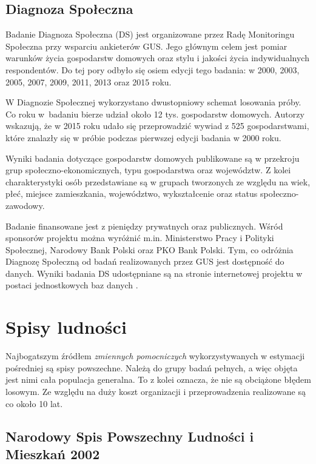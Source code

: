 \subsection{Diagnoza Społeczna}

Badanie Diagnoza Społeczna (DS) jest organizowane przez Radę Monitoringu Społeczna przy wsparciu ankieterów GUS. Jego głównym celem jest pomiar warunków życia gospodarstw domowych oraz stylu i jakości życia indywidualnych respondentów. Do tej pory odbyło się osiem edycji tego badania: w 2000, 2003, 2005, 2007, 2009, 2011, 2013 oraz 2015 roku. 

W Diagnozie Społecznej wykorzystano dwustopniowy schemat losowania próby. Co roku w~badaniu bierze udział około 12 tys. gospodarstw domowych. Autorzy wskazują, że w 2015 roku udało się przeprowadzić wywiad z 525 gospodarstwami, które znalazły się w próbie podczas pierwszej edycji badania w 2000 roku.

Wyniki badania dotyczące gospodarstw domowych publikowane są w przekroju grup społeczno-ekonomicznych, typu gospodarstwa oraz województw. Z kolei charakterystyki osób przedstawiane są w grupach tworzonych ze względu na wiek, płeć, miejsce zamieszkania, województwo, wykształcenie oraz status społeczno-zawodowy.

Badanie finansowane jest z pieniędzy prywatnych oraz publicznych. Wśród sponsorów projektu można wyróżnić m.in. Ministerstwo Pracy i Polityki Społecznej, Narodowy Bank Polski oraz PKO Bank Polski. Tym, co odróżnia Diagnozę Społeczną od badań realizowanych przez GUS jest dostępność do danych. Wyniki badania DS udostępniane są na stronie internetowej projektu w postaci jednostkowych baz danych \citep{diagnoza-panek2015}.

\section{Spisy ludności}

Najbogatszym źródłem \textit{zmiennych pomocniczych} wykorzystywanych w estymacji pośredniej są spisy powszechne. Należą do grupy badań pełnych, a więc objęta jest nimi cała populacja generalna. To z kolei oznacza, że nie są obciążone błędem losowym. Ze względu na duży koszt organizacji i przeprowadzenia realizowane są co około 10 lat.

\subsection{Narodowy Spis Powszechny Ludności i Mieszkań 2002}

